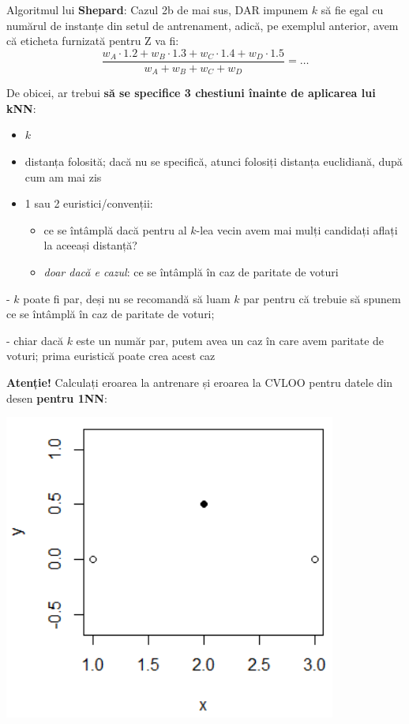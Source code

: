 \documentclass[12pt]{article}
\begin{document}
	Algoritmul lui \textbf{Shepard}: Cazul 2b de mai sus, DAR impunem $k$ să fie egal cu numărul de instanțe din setul de antrenament, adică, pe exemplul anterior, avem că eticheta furnizată pentru Z va fi:
	$$\frac{w_A \cdot 1.2 + w_B \cdot 1.3 + w_C \cdot 1.4 + w_D \cdot 1.5}{w_A + w_B + w_C + w_D} = \dots$$
	
		De obicei, ar trebui \textbf{să se specifice 3 chestiuni înainte de aplicarea lui kNN}:
	\begin{itemize}
		\item $k$
		\item distanța folosită; dacă nu se specifică, atunci folosiți distanța euclidiană, după cum am mai zis
		\item 1 sau 2 euristici/convenții:
		\begin{itemize}
			\item ce se întâmplă dacă pentru al $k$-lea vecin avem mai mulți candidați aflați la aceeași distanță?
			\item \textit{doar dacă e cazul}: ce se întâmplă în caz de paritate de voturi
		\end{itemize}
	\end{itemize}
	
	- $k$ poate fi par, deși nu se recomandă să luam $k$ par pentru că trebuie să spunem ce se întâmplă în caz de paritate de voturi; 
	
	- chiar dacă $k$ este un număr par, putem avea un caz în care avem paritate de voturi; prima euristică poate crea acest caz
	
	\textbf{Atenție!} Calculați eroarea la antrenare și eroarea la CVLOO pentru datele din desen \textbf{pentru 1NN}:
	\begin{center}
		\includegraphics{screenshot008}
	\end{center}
	
\end{document}
